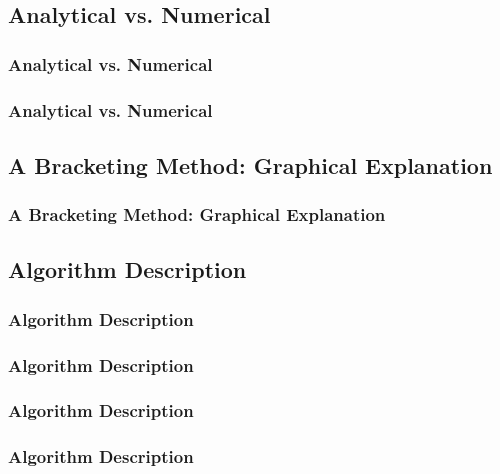 \documentclass[fleqn]{beamer} %
\newcommand{\sectionIIIsubsectionItitle}{Analytical vs. Numerical}
\newcommand{\sectionIIIsubsectionIItitle}{A Bracketing Method: Graphical Explanation}
\newcommand{\sectionIIIsubsectionIIItitle}{Algorithm Description}
\begin{document}
		\subsection{\sectionIIIsubsectionItitle}\label{sectionIIIsubsectionI}

			\begin{frame}
				\frametitle{\sectionIIIsubsectionItitle}
				\bigskip
					
				\btVFill
			\end{frame}

			\begin{frame}
				\frametitle{\sectionIIIsubsectionItitle}
				\bigskip

				\btVFill
			\end{frame}

		\subsection{\sectionIIIsubsectionIItitle}\label{sectionIIIsubsectionII}	

			\begin{frame}
				\frametitle{\sectionIIIsubsectionIItitle}
				\bigskip

				\btVFill
			\end{frame}

		\subsection{\sectionIIIsubsectionIIItitle}\label{sectionIIIsubsectionIII}

			\begin{frame}
				\frametitle{\sectionIIIsubsectionIIItitle}
				\bigskip
				
				\btVFill
			\end{frame}

			\begin{frame}
				\frametitle{\sectionIIIsubsectionIIItitle}
				\bigskip
		
				\btVFill
			\end{frame}

			\begin{frame}
				\frametitle{\sectionIIIsubsectionIIItitle}
				\bigskip
				
				\btVFill
			\end{frame}

			\begin{frame}
				\frametitle{\sectionIIIsubsectionIIItitle}
				\bigskip

				\btVFill
			\end{frame}
\end{document}
